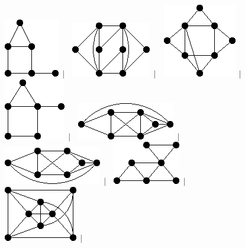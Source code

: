 \documentclass[11pt,paper=b5,footinclude,headinclude]{scrbook} %
\newtheorem{ex}{Vaja\hypertarget{sol:\theex}}[chapter]
\begin{document}
\begin{ex}
\begin{figure}
\includegraphics[scale=0.5]{smallGraphs/g_co-X5.png}$\,\mid\,$\
\includegraphics[scale=0.5]{smallGraphs/g_co-X50.png}$\,\mid\,$\
\includegraphics[scale=0.5]{smallGraphs/g_co-X52.png}$\,\mid\,$\
\includegraphics[scale=0.5]{smallGraphs/g_co-X58.png}$\,\mid\,$\
\includegraphics[scale=0.5]{smallGraphs/g_co-X6.png}$\,\mid\,$\
\includegraphics[scale=0.5]{smallGraphs/g_co-X7.png}$\,\mid\,$\
\includegraphics[scale=0.5]{smallGraphs/g_co-X70.png}$\,\mid\,$\
\includegraphics[scale=0.5]{smallGraphs/g_co-X74.png}$\,\mid\,$\

\end{figure}
\end{ex}
\end{document}
